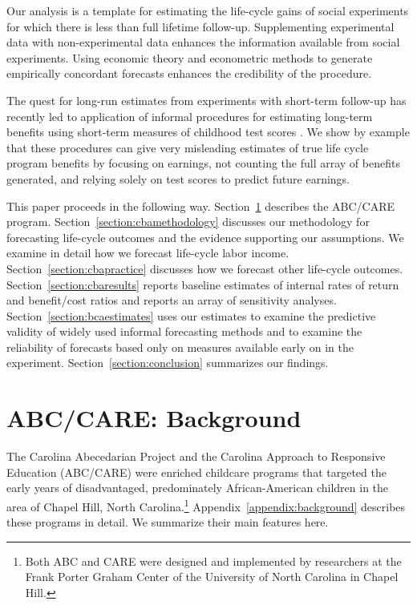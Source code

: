 Our analysis is a template for estimating the life-cycle gains of social experiments for which there is less than full lifetime follow-up. Supplementing experimental data with non-experimental data enhances the information available from social experiments. Using economic theory and econometric methods to generate empirically concordant forecasts enhances the credibility of the procedure.

The quest for long-run estimates from experiments with short-term follow-up has recently led to application of informal procedures for estimating long-term benefits using short-term measures of childhood test scores \citep[e.g.][]{Chetty_Friedman_etal_2011_QJoE,Kline_Walters_2016_QJE}. We show by example that these procedures can give very misleading estimates of true life cycle program benefits by focusing on earnings, not counting the full array of benefits generated, and relying solely on test scores to predict future earnings.

This paper proceeds in the following way. Section~\ref{section:background} describes the ABC/CARE program. Section~\ref{section:cbamethodology} discusses our methodology for forecasting life-cycle outcomes and the evidence supporting our assumptions. We examine in detail how we forecast life-cycle labor income. Section~\ref{section:cbapractice} discusses how we forecast other life-cycle outcomes. Section~\ref{section:cbaresults} reports baseline estimates of internal rates of return and benefit/cost ratios and reports an array of sensitivity analyses. Section~\ref{section:bcaestimates} uses our estimates to examine the predictive validity of widely used informal forecasting methods and to examine the reliability of forecasts based only on measures available early on in the experiment. Section~\ref{section:conclusion} summarizes our findings.

\section{ABC/CARE: Background} \label{section:background}

\noindent The Carolina Abecedarian Project and the Carolina Approach to Responsive Education (ABC/CARE) were enriched childcare programs that targeted the early years of disadvantaged, predominately African-American children in the area of Chapel Hill, North Carolina.\footnote{Both ABC and CARE were designed and implemented by researchers at the Frank Porter Graham Center of the University of North Carolina in Chapel Hill.} Appendix~\ref{appendix:background} describes these programs in detail. We summarize their main features here.

